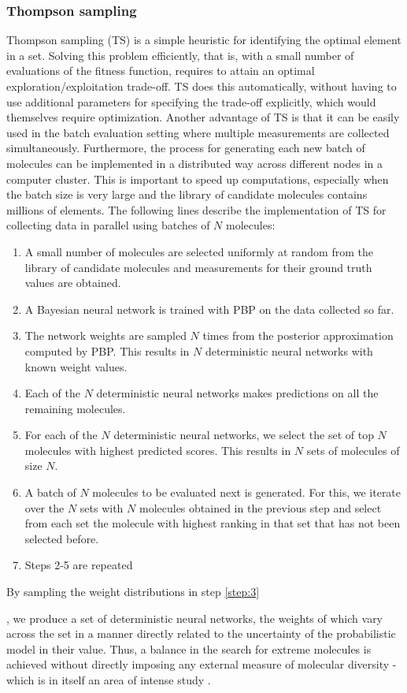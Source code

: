 \subsubsection{Thompson sampling}

Thompson sampling (TS) \cite{Thompson_1933} is a simple heuristic for identifying the optimal element in a set. Solving this problem efficiently, that is, with a small number of evaluations of the fitness function, requires to attain an optimal exploration/exploitation trade-off. TS does this automatically, without having to use additional parameters for specifying the trade-off explicitly, which would themselves require optimization. Another advantage of TS is that it can be easily used
in the batch evaluation setting where multiple measurements are collected simultaneously. Furthermore, the process for generating each new batch of molecules can be implemented in a distributed way across different nodes in a computer cluster. This is important to speed up computations, especially when the batch size is very large and the library of candidate molecules contains millions of elements. The following lines describe the implementation of TS for collecting data in parallel using batches of $N$ molecules:
\begin{enumerate}
\item A small number of molecules are selected uniformly at random from the library of candidate molecules and measurements for their ground truth values are obtained.
\item A Bayesian neural network is trained with PBP on the data collected so far.
\item The network weights are sampled $N$ times from the posterior approximation computed by PBP. This results in $N$ deterministic neural networks with known weight values. \label{step:3}
\item Each of the $N$ deterministic neural networks makes predictions on all the remaining molecules. 
\item For each of the $N$ deterministic neural networks, we select the set of top $N$ molecules with highest predicted scores. This results in $N$ sets of molecules of size $N$.
\item A batch of $N$ molecules to be evaluated next is generated. For this, we iterate over the $N$ sets with $N$ molecules obtained in the previous step and select from each set the molecule with highest ranking in that set that has not been selected before.
\item Steps 2-5 are repeated
\end{enumerate}

By sampling the weight distributions in step \ref{step:3}

, we produce a set of deterministic neural networks, the weights of which vary across the set in a manner directly related to the uncertainty of the probabilistic model in their value.  Thus, a balance in the search for extreme molecules is achieved without directly imposing any external measure of molecular diversity - which is in itself an area of intense study \cite{Maldonado_2006}.